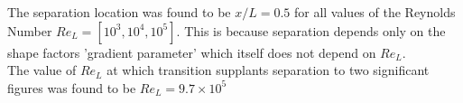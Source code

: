 

\vspace{0.2cm}

The separation location was found to be $x/L = 0.5$ for all values of the Reynolds Number $Re_L = [10^3, 10^4, 10^5]$. This is because separation depends only on the shape factors 'gradient parameter' which itself does not depend on $Re_L$.\\[5pt]


The value of $Re_L$ at which transition supplants separation to two significant figures was found to be $Re_L = 9.7\times10^5$

